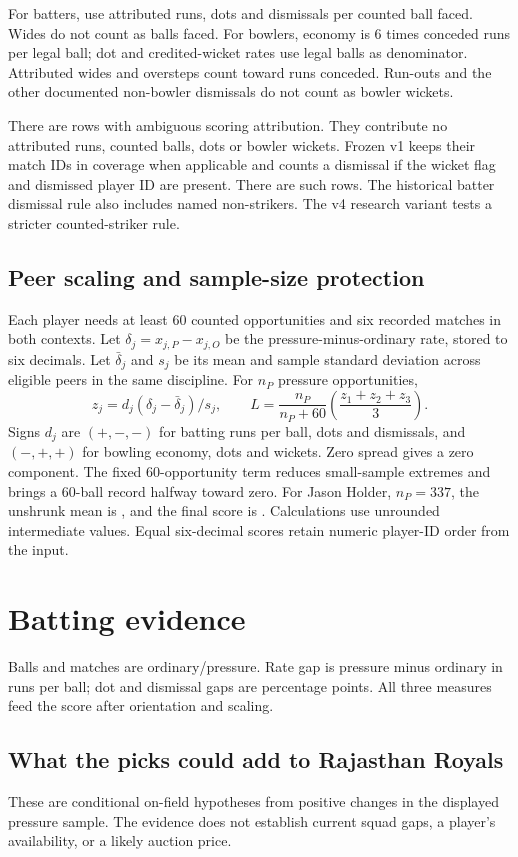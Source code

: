 \documentclass[11pt,a4paper]{article}
\begin{document}
For batters, use attributed runs, dots and dismissals per counted ball faced. Wides do not count as balls faced. For bowlers, economy is $6$ times conceded runs per legal ball; dot and credited-wicket rates use legal balls as denominator. Attributed wides and oversteps count toward runs conceded. Run-outs and the other documented non-bowler dismissals do not count as bowler wickets.

There are \Ambiguous{} rows with ambiguous scoring attribution. They contribute no attributed runs, counted balls, dots or bowler wickets. Frozen v1 keeps their match IDs in coverage when applicable and counts a dismissal if the wicket flag and dismissed player ID are present. There are \AmbiguousDismissals{} such rows. The historical batter dismissal rule also includes named non-strikers. The v4 research variant tests a stricter counted-striker rule.

\subsection*{Peer scaling and sample-size protection}
Each player needs at least 60 counted opportunities and six recorded matches in both contexts. Let $\delta_j=x_{j,P}-x_{j,O}$ be the pressure-minus-ordinary rate, stored to six decimals. Let $\bar\delta_j$ and $s_j$ be its mean and sample standard deviation across eligible peers in the same discipline. For $n_P$ pressure opportunities,
\[
z_j=d_j(\delta_j-\bar\delta_j)/s_j,\qquad
L=\frac{n_P}{n_P+60}\left(\frac{z_1+z_2+z_3}{3}\right).
\]
Signs $d_j$ are $(+,-,-)$ for batting runs per ball, dots and dismissals, and $(-,+,+)$ for bowling economy, dots and wickets. Zero spread gives a zero component. The fixed 60-opportunity term reduces small-sample extremes and brings a 60-ball record halfway toward zero. For Jason Holder, $n_P=337$, the unshrunk mean is \HolderRaw{}, and the final score is \HolderScore{}. Calculations use unrounded intermediate values. Equal six-decimal scores retain numeric player-ID order from the input.

\clearpage
\section*{Batting evidence}
Balls and matches are ordinary/pressure. Rate gap is pressure minus ordinary in runs per ball; dot and dismissal gaps are percentage points. All three measures feed the score after orientation and scaling.
\BatterEvidence
\subsection*{What the picks could add to Rajasthan Royals}
These are conditional on-field hypotheses from positive changes in the displayed pressure sample. The evidence does not establish current squad gaps, a player's availability, or a likely auction price.
\BatterFit
\end{document}
